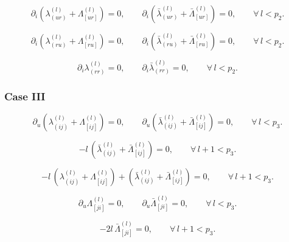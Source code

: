 \documentclass[a4paper,12pt]{article}
\begin{document}
\begin{equation}
\partial_i\!\left(\lambda_{(ur)}^{(l)}+\Lambda_{[ur]}^{(l)}\right)=0,
\qquad
\partial_i\!\left(\bar\lambda_{(ur)}^{(l)}+\bar\Lambda_{[ur]}^{(l)}\right)=0,
\qquad \forall\, l<p_2 .
\end{equation}



\begin{equation}
\partial_i\!\left(\lambda_{(ru)}^{(l)}+\Lambda_{[ru]}^{(l)}\right)=0,
\qquad
\partial_i\!\left(\bar\lambda_{(ru)}^{(l)}+\bar\Lambda_{[ru]}^{(l)}\right)=0,
\qquad \forall\, l<p_2 .
\end{equation}


\begin{equation}
\partial_i \lambda_{(rr)}^{(l)}=0,
\qquad
\partial_i \bar\lambda_{(rr)}^{(l)}=0,
\qquad \forall\, l<p_2 .
\end{equation}

\subsubsection*{Case III}



\begin{equation}
\partial_u\!\left(\lambda_{(ij)}^{(l)}+\Lambda_{[ij]}^{(l)}\right)=0,
\qquad
\partial_u\!\left(\bar\lambda_{(ij)}^{(l)}+\bar\Lambda_{[ij]}^{(l)}\right)=0,
\qquad \forall\, l<p_3 .
\end{equation}


\begin{equation}
-l\,\left(\bar\lambda_{(ij)}^{(l)}+\bar\Lambda_{[ij]}^{(l)}\right)=0,
\qquad \forall\, l+1<p_3 .
\end{equation}

\begin{equation}
-l\,\left(\lambda_{(ij)}^{(l)}+\Lambda_{[ij]}^{(l)}\right)
+\left(\bar\lambda_{(ij)}^{(l)}+\bar\Lambda_{[ij]}^{(l)}\right)
=0,
\qquad \forall\, l+1<p_3 .
\end{equation}



\begin{equation}
\partial_u \Lambda_{[ji]}^{(l)}=0,
\qquad
\partial_u \bar\Lambda_{[ji]}^{(l)}=0,
\qquad \forall\, l<p_3 .
\end{equation}




\begin{equation}
-2l\,\bar\Lambda_{[ji]}^{(l)}=0,
\qquad \forall\, l+1<p_3 .
\end{equation}
\end{document}
